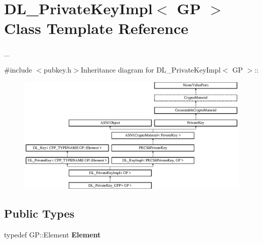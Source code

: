 \hypertarget{class_d_l___private_key_impl}{
\section{DL\_\-PrivateKeyImpl$<$ GP $>$ Class Template Reference}
\label{class_d_l___private_key_impl}
}


\_\-  


{\ttfamily \#include $<$pubkey.h$>$}Inheritance diagram for DL\_\-PrivateKeyImpl$<$ GP $>$::\begin{figure}[H]
\begin{center}
\leavevmode
\includegraphics[height=5.56291cm]{class_d_l___private_key_impl}
\end{center}
\end{figure}
\subsection*{Public Types}
\begin{DoxyCompactItemize}
\item 
\hypertarget{class_d_l___private_key_impl_a002d0346b867474c9d7a80356f6c7888}{
typedef GP::Element {\bfseries Element}}
\label{class_d_l___private_key_impl_a002d0346b867474c9d7a80356f6c7888}

\end{DoxyCompactItemize}
